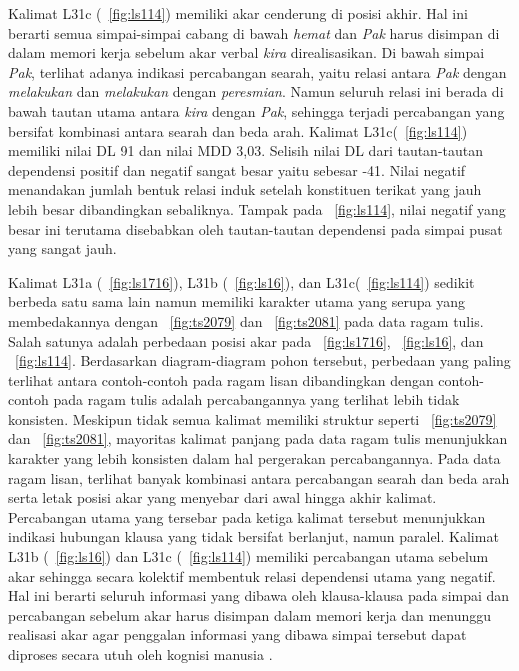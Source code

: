 Kalimat L31c (\pic~\ref{fig:ls114}) memiliki akar cenderung di posisi akhir. Hal ini berarti semua simpai-simpai cabang di bawah \textit{hemat} dan \textit{Pak} harus disimpan di dalam memori kerja sebelum akar verbal \textit{kira} direalisasikan. Di bawah simpai \textit{Pak}, terlihat adanya indikasi percabangan searah, yaitu relasi antara \textit{Pak} dengan \textit{melakukan} dan \textit{melakukan} dengan \textit{peresmian}. Namun seluruh relasi ini berada di bawah tautan utama antara \textit{kira} dengan \textit{Pak}, sehingga terjadi percabangan yang bersifat kombinasi antara searah dan beda arah. Kalimat L31c(\pic~\ref{fig:ls114}) memiliki nilai DL 91 dan nilai MDD 3,03. Selisih nilai DL dari tautan-tautan dependensi positif dan negatif sangat besar yaitu sebesar -41. Nilai negatif menandakan jumlah bentuk relasi induk setelah konstituen terikat yang jauh lebih besar dibandingkan sebaliknya. Tampak pada \pic~\ref{fig:ls114}, nilai negatif yang besar ini terutama disebabkan oleh tautan-tautan dependensi pada simpai pusat yang sangat jauh.

Kalimat L31a (\pic~\ref{fig:ls1716}), L31b (\pic~\ref{fig:ls16}), dan L31c(\pic~\ref{fig:ls114}) sedikit berbeda satu sama lain namun memiliki karakter utama yang serupa yang membedakannya dengan \pic~\ref{fig:ts2079} dan \pic~\ref{fig:ts2081} pada data ragam tulis. Salah satunya adalah perbedaan posisi akar pada \pic~\ref{fig:ls1716}, \pic~\ref{fig:ls16}, dan \pic~\ref{fig:ls114}. Berdasarkan diagram-diagram pohon tersebut, perbedaan yang paling terlihat antara contoh-contoh pada ragam lisan dibandingkan dengan contoh-contoh pada ragam tulis adalah percabangannya yang terlihat lebih tidak konsisten. Meskipun tidak semua kalimat memiliki struktur seperti \pic~\ref{fig:ts2079} dan \pic~\ref{fig:ts2081}, mayoritas kalimat panjang pada data ragam tulis menunjukkan karakter yang lebih konsisten dalam hal pergerakan percabangannya. Pada data ragam lisan, terlihat banyak kombinasi antara percabangan searah dan beda arah serta letak posisi akar yang menyebar dari awal hingga akhir kalimat. Percabangan utama yang tersebar pada ketiga kalimat tersebut menunjukkan indikasi hubungan klausa yang tidak bersifat berlanjut, namun paralel. Kalimat L31b (\pic~\ref{fig:ls16}) dan L31c (\pic~\ref{fig:ls114}) memiliki percabangan utama sebelum akar sehingga secara kolektif membentuk relasi dependensi utama yang negatif. Hal ini berarti seluruh informasi yang dibawa oleh klausa-klausa pada simpai dan percabangan sebelum akar harus disimpan dalam memori kerja dan menunggu realisasi akar agar penggalan informasi yang dibawa simpai tersebut dapat diproses secara utuh oleh kognisi manusia \citep{hawkins2014cross}.

